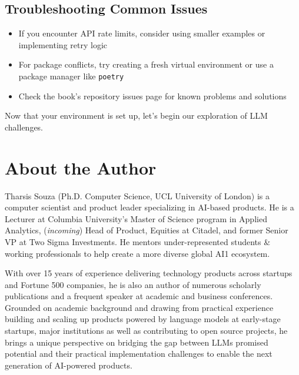 \subsection{Troubleshooting Common Issues}
\begin{itemize}
\item If you encounter API rate limits, consider using smaller examples or implementing retry logic
\item For package conflicts, try creating a fresh virtual environment or use a package manager like \texttt{poetry}
\item Check the book's repository issues page for known problems and solutions
\end{itemize}

Now that your environment is set up, let's begin our exploration of LLM challenges.

\section{About the Author}

Tharsis Souza (Ph.D. Computer Science, UCL University of London) is a computer scientist and product leader specializing in AI-based products. He is a Lecturer at Columbia University's Master of Science program in Applied Analytics, (\textit{incoming}) Head of Product, Equities at Citadel, and former Senior VP at Two Sigma Investments. He mentors under-represented students \& working professionals to help create a more diverse global AI1 ecosystem.

With over 15 years of experience delivering technology products across startups and Fortune 500 companies, he is also an author of numerous scholarly publications and a frequent speaker at academic and business conferences. Grounded on academic background and drawing from practical experience building and scaling up products powered by language models at early-stage startups, major institutions as well as contributing to open source projects, he brings a unique perspective on bridging the gap between LLMs promised potential and their practical implementation challenges to enable the next generation of AI-powered products.

